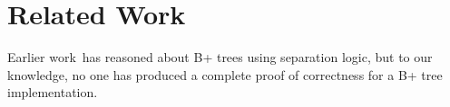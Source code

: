 \section{Related Work}
\label{sec:RelatedWork}
Earlier work\,\cite{sexton2008reasoning} has reasoned about B+ trees using separation logic, but to our knowledge, no one has produced a complete proof of correctness for a B+ tree implementation.



